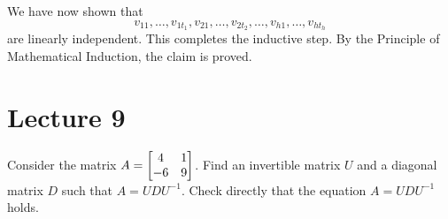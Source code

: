 \documentclass[a4paper]{amsart}
\renewenvironment{solution}{\SolutionInline}{\endSolutionInline}
\begin{document}
\begin{solution}
 We have now shown that
 $$
 v_{11}, \ldots, v_{1t_1},v_{21}, \ldots, v_{2t_2}, \ldots, v_{h1},
 \ldots, v_{ht_h}
 $$
 are linearly independent. This completes the inductive step. By the
 Principle of
 Mathematical Induction, the claim is proved.

\end{solution}

\section{Lecture 9}

\begin{exercise}\label{ex-diagonal-i}
 Consider the matrix $A=\left[\begin{matrix} 4&1\\ -6&9\end{matrix}\right]$.  Find an invertible 
 matrix $U$ and a diagonal matrix $D$ such that $A=UDU^{-1}$.  Check
 directly that the equation $A=UDU^{-1}$ holds.
\end{exercise}
\end{document}
